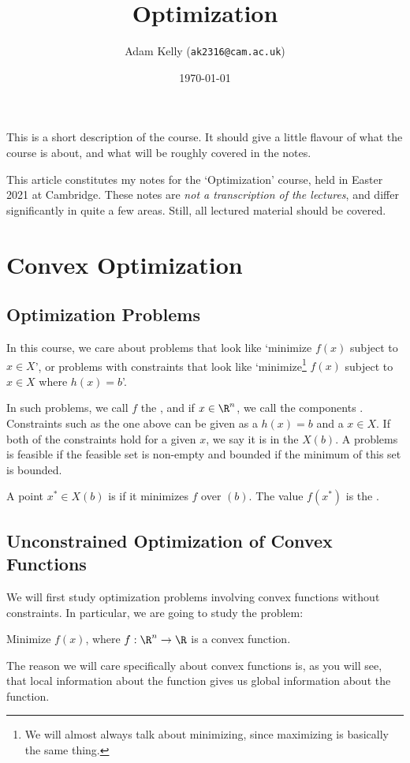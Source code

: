 \documentclass[a4paper]{article}
\title{Optimization}
\author{Adam Kelly (\texttt{ak2316@cam.ac.uk})}
\date{\today}
\begin{document}
\maketitle

This is a short description of the course. It should give a little flavour of what the course is about, and what will be roughly covered in the notes.

This article constitutes my notes for the `Optimization' course, held in Easter 2021 at Cambridge. These notes are \emph{not a transcription of the lectures}, and differ significantly in quite a few areas. Still, all lectured material should be covered.


\section{Convex Optimization}

\subsection{Optimization Problems}

In this course, we care about problems that look like `minimize $f(x)$ subject to $x \in X$', or problems with constraints that look like `minimize\footnote{We will almost always talk about minimizing, since maximizing is basically the same thing.} $f(x)$ subject to $x \in X$ where $h(x) = b$'.

In such problems, we call $f$ the , and if $x \in \R^n$, we call the components . Constraints such as the one above can be given as a  $h(x) = b$ and a  $x \in X$. If both of the constraints hold for a given $x$, we say it is in the  $X(b)$. A problems is feasible if the feasible set is non-empty and bounded if the minimum of this set is bounded.

A point $x^* \in X(b)$ is  if it minimizes $f$ over $(b)$. The value $f(x^*)$ is the .

\subsection{Unconstrained Optimization of Convex Functions}

We will first study optimization problems involving convex functions without constraints. In particular, we are going to study the problem:
\begin{center}
    Minimize $f(x)$, where $f : \R^n \rightarrow \R$ is a convex function.
\end{center}
The reason we will care specifically about convex functions is, as you will see, that local information about the function gives us global information about the function.
\end{document}
